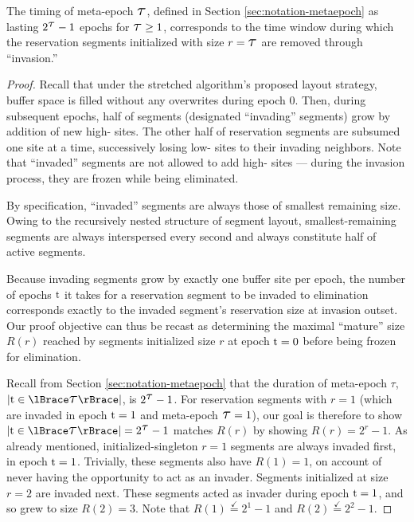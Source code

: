 \begin{lemma}
\label{thm:stretched-meta-epoch}

The timing of meta-epoch $\colortau$, defined in Section \ref{sec:notation-metaepoch} as lasting $2^{\colortau} - 1$ epochs for $\colortau\geq1$, corresponds to the time window during which the reservation segments initialized with size $r=\colortau$ are removed through ``invasion.''
\end{lemma}

\begin{proof}

Recall that under the stretched algorithm's proposed layout strategy, buffer space is filled without any overwrites during epoch 0.
Then, during subsequent epochs, half of segments (designated ``invading'' segments) grow by addition of new high-\hv{} sites.
The other half of reservation segments are subsumed one site at a time, successively losing low-\hv{} sites to their invading neighbors.
Note that ``invaded'' segments are not allowed to add high-\hv{} sites --- during the invasion process, they are frozen while being eliminated.

By specification, ``invaded'' segments are always those of smallest remaining size.
Owing to the recursively nested structure of segment layout, smallest-remaining segments are always interspersed every second and always constitute half of active segments.

Because invading segments grow by exactly one buffer site per epoch, the number of epochs $\colort$ it takes for a reservation segment to be invaded to elimination corresponds exactly to the invaded segment's reservation size at invasion outset.
Our proof objective can thus be recast as determining the maximal ``mature'' size $R(r)$ reached by segments initialized size $r$ at epoch $\colort=0$ before being frozen for elimination.

Recall from Section \ref{sec:notation-metaepoch} that the duration of meta-epoch $\tau$, $|\colort \in \colortausetoft|$, is $2^{\colortau} - 1$.
For reservation segments with $r=1$ (which are invaded in epoch $\colort=1$ and meta-epoch $\colortau = 1$), our goal is therefore to show $|\colort \in \colortausetoft| = 2^{\colortau} - 1$ matches $R(r)$ by showing $R(r) = 2^{r} - 1$.
As already mentioned, initialized-singleton $r=1$ segments are always invaded first, in epoch $\colort=1$.
Trivially, these segments also have $R(1) = 1$, on account of never having the opportunity to act as an invader.
Segments initialized at size $r=2$ are invaded next.
These segments acted as invader during epoch $\colort=1$, and so grew to size $R(2) = 3$.
Note that $R(1) \stackrel{\checkmark}{=} 2^1 - 1$ and $R(2) \stackrel{\checkmark}{=} 2^2 - 1$.


\end{proof}
